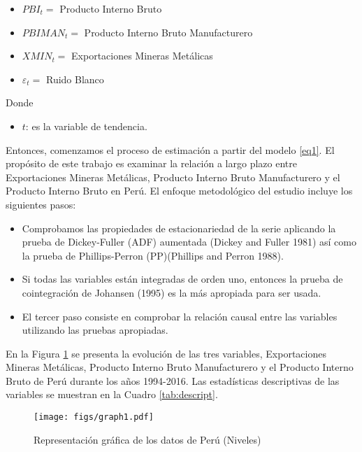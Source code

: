 \documentclass[11pt,]{article}
\providecommand{\tightlist}{%
\setlength{\itemsep}{0pt}\setlength{\parskip}{0pt}}
\begin{document}
\begin{itemize}
\tightlist
\item
  \({PBI}_t =\) Producto Interno Bruto
\item
  \({PBIMAN}_t =\) Producto Interno Bruto Manufacturero
\item
  \({XMIN}_t =\) Exportaciones Mineras Metálicas
\item
  \(\varepsilon_t =\) Ruido Blanco
\end{itemize}

Donde

\begin{itemize}
\tightlist
\item
  \(t\): es la variable de tendencia.
\end{itemize}

Entonces, comenzamos el proceso de estimación a partir del modelo
\ref{eq1}. El propósito de este trabajo es examinar la relación a largo
plazo entre Exportaciones Mineras Metálicas, Producto Interno Bruto
Manufacturero y el Producto Interno Bruto en Perú. El enfoque
metodológico del estudio incluye los siguientes pasos:

\begin{itemize}
\tightlist
\item
  Comprobamos las propiedades de estacionariedad de la serie aplicando
  la prueba de Dickey-Fuller (ADF) aumentada (Dickey and Fuller 1981)
  así como la prueba de Phillips-Perron (PP)(Phillips and Perron 1988).
\item
  Si todas las variables están integradas de orden uno, entonces la
  prueba de cointegración de Johansen (1995) es la más apropiada para
  ser usada.
\item
  El tercer paso consiste en comprobar la relación causal entre las
  variables utilizando las pruebas apropiadas.
\end{itemize}

En la Figura \ref{fig:plot1} se presenta la evolución de las tres
variables, Exportaciones Mineras Metálicas, Producto Interno Bruto
Manufacturero y el Producto Interno Bruto de Perú durante los años
1994-2016. Las estadísticas descriptivas de las variables se muestran en
la Cuadro \ref{tab:descript}.

\begin{figure}
\centering
\texttt{[image: figs/graph1.pdf]}
\caption{\label{fig:plot1} Representación gráfica de los datos de Perú
(Niveles)}
\end{figure}
\end{document}
